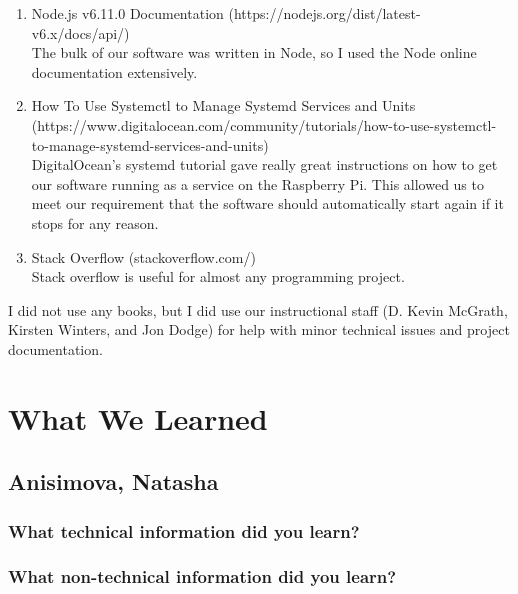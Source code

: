 \documentclass[10pt,draftclsnofoot,onecolumn]{IEEEtran}
\begin{document}
\begin{enumerate}
\item Node.js v6.11.0 Documentation (https://nodejs.org/dist/latest-v6.x/docs/api/)\\
The bulk of our software was written in Node, so I used the Node online documentation extensively.
\item How To Use Systemctl to Manage Systemd Services and Units (https://www.digitalocean.com/community/tutorials/how-to-use-systemctl-to-manage-systemd-services-and-units)\\
DigitalOcean's systemd tutorial gave really great instructions on how to get our software running as a service on the Raspberry Pi. This allowed us to meet our requirement that the software should automatically start again if it stops for any reason.
\item Stack Overflow (stackoverflow.com/)\\
Stack overflow is useful for almost any programming project.
\end{enumerate}
I did not use any books, but I did use our instructional staff (D. Kevin McGrath, Kirsten Winters, and Jon Dodge) for help with minor technical issues and project documentation.


























\newpage
\section{What We Learned}

\subsection{Anisimova, Natasha}

\subsubsection{What technical information did you learn?}
\subsubsection{What non-technical information did you learn?}
\end{document}
